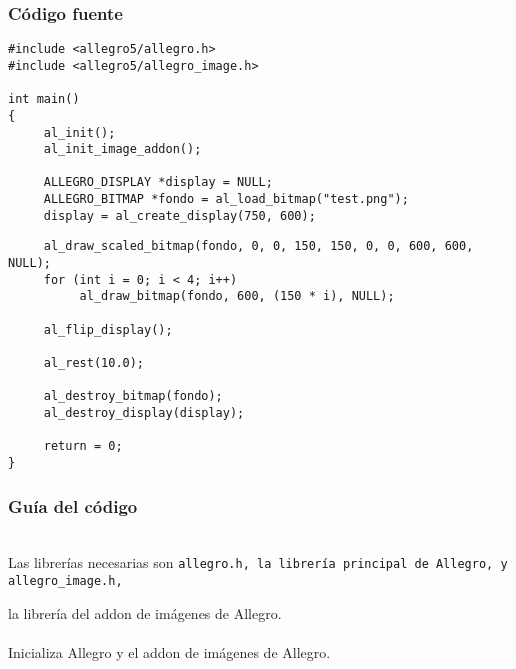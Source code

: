 \documentclass[11pt]{article}
\begin{document}
\subsubsection{Código fuente}
\begin{verbatim}
#include <allegro5/allegro.h>
#include <allegro5/allegro_image.h>

int main() 
{
     al_init();
     al_init_image_addon();
     
     ALLEGRO_DISPLAY *display = NULL;
     ALLEGRO_BITMAP *fondo = al_load_bitmap("test.png");
     display = al_create_display(750, 600);
\end{verbatim}
\pagebreak
\begin{verbatim}
     al_draw_scaled_bitmap(fondo, 0, 0, 150, 150, 0, 0, 600, 600, NULL);
     for (int i = 0; i < 4; i++)
          al_draw_bitmap(fondo, 600, (150 * i), NULL);
      
     al_flip_display();
     
     al_rest(10.0);
     
     al_destroy_bitmap(fondo);
     al_destroy_display(display);
     
     return = 0;
}
\end{verbatim}
\subsubsection{Guía del código}

\\

Las librerías necesarias son \tt allegro.h\rm , la librería principal de Allegro, y \tt allegro\_image.h\rm ,

la librería del addon de imágenes de Allegro.\\

\\

Inicializa Allegro y el addon de imágenes de Allegro.\\

\\
\end{document}
